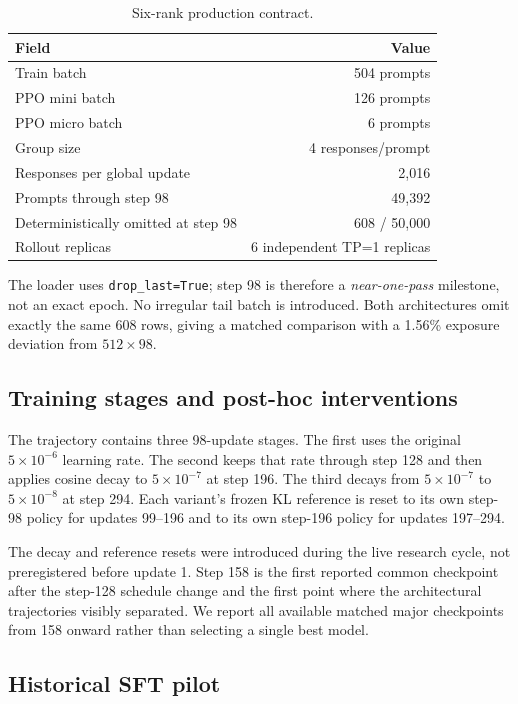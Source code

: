 \documentclass[10pt]{article}
\begin{document}
\begin{table}[!tbp]
\centering
\caption{Six-rank production contract.}
\label{tab:batch}
\begin{tabular}{lr}
\toprule
Field & Value \\
\midrule
Train batch & 504 prompts \\
PPO mini batch & 126 prompts \\
PPO micro batch & 6 prompts \\
Group size & 4 responses/prompt \\
Responses per global update & 2,016 \\
Prompts through step 98 & 49,392 \\
Deterministically omitted at step 98 & 608 / 50,000 \\
Rollout replicas & 6 independent TP=1 replicas \\
\bottomrule
\end{tabular}
\end{table}

The loader uses \texttt{drop\_last=True}; step 98 is therefore a
\emph{near-one-pass} milestone, not an exact epoch.  No irregular tail batch is
introduced.  Both architectures omit exactly the same 608 rows, giving a
matched comparison with a 1.56\% exposure deviation from $512\times98$.

\subsection{Training stages and post-hoc interventions}

The trajectory contains three 98-update stages.  The first uses the original
$5\times10^{-6}$ learning rate.  The second keeps that rate through step 128
and then applies cosine decay to $5\times10^{-7}$ at step 196.  The third
decays from $5\times10^{-7}$ to $5\times10^{-8}$ at step 294.  Each variant's
frozen KL reference is reset to its own step-98 policy for updates 99--196 and
to its own step-196 policy for updates 197--294.

The decay and reference resets were introduced during the live research cycle,
not preregistered before update 1.  Step 158 is the first reported common
checkpoint after the step-128 schedule change and the first point where the
architectural trajectories visibly separated.  We report all available matched
major checkpoints from 158 onward rather than selecting a single best model.

\subsection{Historical SFT pilot}
\end{document}
